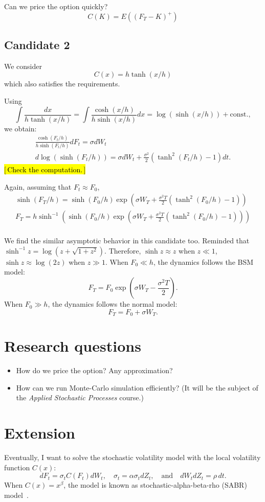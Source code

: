 \documentclass[authoryear,reqno,12pt,a4paper]{elsarticle}
\newcommand{\vov}{\alpha}
\newcommand{\qtext}[2][\quad]{#1\text{#2}#1}
\newcommand{\todo}[1]{\hl{[\,#1\,]}}
\begin{document}
Can we price the option quickly?
$$C(K) = E\left( (F_T-K)^+\right)
$$



\subsection{Candidate 2}
We consider 
$$ C(x) = h\tanh(x/h)$$
which also satisfies the requirements.

Using
$$ \int \frac{dx}{h\tanh(x/h)} = \int \frac{\cosh(x/h)}{h\sinh(x/h)} dx = \log(\sinh(x/h)) + \text{const.},
$$
we obtain:
\begin{gather*}
\frac{\cosh(F_t/h)}{h\sinh(F_t/h)} dF_t = \sigma dW_t \\
d \log(\sinh(F_t/h)) = \sigma dW_t + \frac{\sigma^2}{2} (\tanh^2(F_t/h)-1) dt.
\end{gather*}
\todo{Check the computation.}

Again, assuming that $F_t\approx F_0$,
\begin{gather*}
\sinh(F_T/h) = \sinh(F_0/h) \exp \left(
\sigma W_T + \frac{\sigma^2 T}{2} (\tanh^2(F_0/h)-1)
\right) \\
F_T = h \sinh^{-1} \left( \sinh(F_0/h) \exp \left(\sigma W_T + \frac{\sigma^2 T}{2} (\tanh^2(F_0/h)-1)
\right) \right) \\
\end{gather*}

We find the similar asymptotic behavior in this candidate too. Reminded that $\sinh^{-1} z = \log(z+\sqrt{1+z^2})$. Therefore, $\sinh z \approx z$ when $z\ll 1$, $\sinh z \approx \log(2z)$ when $z\gg 1$.
When $F_0 \ll h$, the dynamics follows the BSM model:
$$ F_T = F_0 \exp\left( \sigma W_T - \frac{\sigma^2 T}{2} \right).
$$
When $F_0 \gg h$, the dynamics follows the normal model:
$$ F_T = F_0 + \sigma W_T.
$$

\section{Research questions}
\begin{itemize}
	\item How do we price the option? Any approximation?
	\item How can we run Monte-Carlo simulation efficiently? (It will be the subject of the \textit{Applied Stochastic Processes} course.)
\end{itemize}

\section{Extension}
Eventually, I want to solve the stochastic volatility model with the local volatility function $C(x)$:
$$ dF_t = \sigma_t C(F_t) dW_t,\quad \sigma_t = \vov \sigma_t dZ_t, \qtext{and} dW_t dZ_t = \rho\, dt. $$ 
When $C(x)=x^\beta$, the model is known as stochastic-alpha-beta-rho (SABR) model~\citep{hagan2002sabr}.


%
\end{document}
